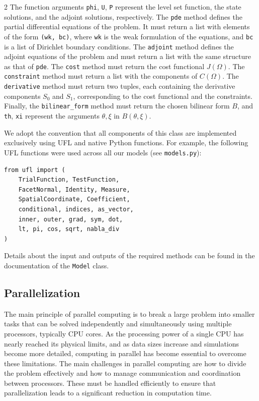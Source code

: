 \documentclass[a4paper, oneside]{article}
\newcommand{\code}[1]{\texttt{#1}}
\begin{document}
\begin{multicols}{2}
The function arguments \code{phi}, \code{U}, \code{P} represent
the level set function, the state solutions, and the adjoint solutions, respectively.
The \code{pde} method defines the partial differential equations of the problem.
It must return a list with elements of the form \code{(wk, bc)},
where \code{wk} is the weak formulation of the equations,
and \code{bc} is a list of Dirichlet boundary conditions.
The \code{adjoint} method defines the adjoint equations of the problem and
must return a list with the same structure as that of \code{pde}. 
The \code{cost} method must return the cost functional $J(\Omega)$.
The \code{constraint} method must return a list with the components of $C(\Omega)$.
The \code{derivative} method must return two tuples,
each containing the derivative components $S_0$ and $S_1$,
corresponding to the cost functional and the constraints.
Finally, the \code{bilinear\_form} method must return
the chosen bilinear form $B$, and \code{th},  \code{xi}
represent the arguments $\theta, \xi$ in $B(\theta, \xi)$.



We adopt the convention that all components of this class are implemented exclusively using
UFL and native Python functions. For example, the following UFL
functions were used across all our models (see \code{models.py}):
\begin{lstlisting}
from ufl import (
    TrialFunction, TestFunction,
    FacetNormal, Identity, Measure,
    SpatialCoordinate, Coefficient,
    conditional, indices, as_vector,
    inner, outer, grad, sym, dot,
    lt, pi, cos, sqrt, nabla_div
)	
\end{lstlisting}

Details about the input and outputs of the required methods
can be found in the documentation of the \code{Model} class.

\subsection{Parallelization}
\label{sub:parallel}



The main principle of parallel computing is to break a large problem into smaller tasks that can be solved independently and simultaneously using multiple processors, typically CPU cores. As the processing power of a single CPU has nearly reached its physical limits, and as data sizes increase and simulations become more detailed, computing in parallel has become essential to overcome these limitations.
The main challenges in parallel computing are how to divide the problem effectively and how to manage communication and coordination between processors. These must be handled efficiently to ensure that parallelization leads to a significant reduction in computation time.


\end{multicols}
\end{document}
